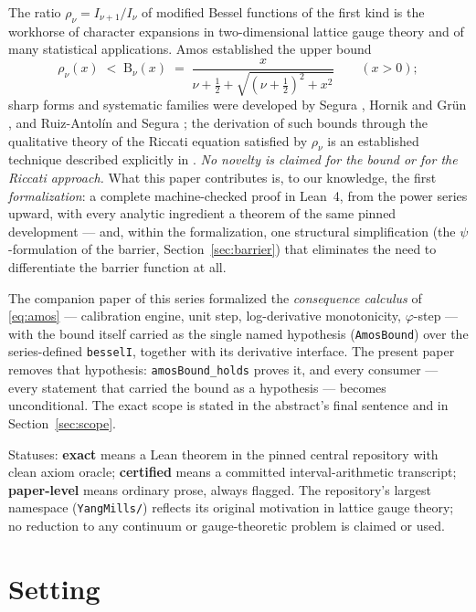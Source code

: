 \documentclass[11pt]{article}
\newcommand{\lean}[1]{\texttt{#1}}
\newcommand{\RHS}{\mathrm{B}}
\begin{document}
The ratio $\rho_\nu = I_{\nu+1}/I_\nu$ of modified Bessel functions
of the first kind is the workhorse of character expansions in
two-dimensional lattice gauge theory and of many statistical
applications.  Amos \cite{Amos74} established the upper bound
\begin{equation}\label{eq:amos}
\rho_\nu(x) \;<\; \RHS_\nu(x) \;=\;
\frac{x}{\nu+\tfrac12+\sqrt{(\nu+\tfrac12)^2+x^2}}
\qquad (x > 0);
\end{equation}
sharp forms and systematic families were developed by Segura
\cite{Segura11}, Hornik and Gr\"un \cite{HG13,HG24}, and
Ruiz-Antol\'in and Segura \cite{RS16}; the derivation of such bounds
through the qualitative theory of the Riccati equation satisfied by
$\rho_\nu$ is an established technique described explicitly in
\cite{RS16}.  \emph{No novelty is claimed for the bound or for the
Riccati approach.}  What this paper contributes is, to our
knowledge, the first \emph{formalization}: a complete machine-checked
proof in Lean~4, from the power series upward, with every analytic
ingredient a theorem of the same pinned development --- and, within
the formalization, one structural simplification (the
$\psi$-formulation of the barrier, Section~\ref{sec:barrier}) that
eliminates the need to differentiate the barrier function at all.

The companion paper of this series \cite{ErikssonC2} formalized the
\emph{consequence calculus} of \eqref{eq:amos} --- calibration
engine, unit step, log-derivative monotonicity, $\varphi$-step ---
with the bound itself carried as the single named hypothesis
(\lean{AmosBound}) over the series-defined \lean{besselI}, together
with its derivative interface.  The present paper removes that
hypothesis: \lean{amosBound\_holds} proves it, and every consumer
--- every statement that carried the bound as a hypothesis ---
becomes unconditional.  The exact scope is stated in the abstract's
final sentence and in Section~\ref{sec:scope}.

Statuses: \textbf{exact} means a Lean theorem in the pinned central
repository with clean axiom oracle; \textbf{certified} means a
committed interval-arithmetic transcript; \textbf{paper-level} means
ordinary prose, always flagged.  The repository's largest
namespace (\lean{YangMills/}) reflects its original motivation in
lattice gauge theory; no reduction to any continuum or
gauge-theoretic problem is claimed or used.

\section{Setting}\label{sec:setting}
\end{document}
